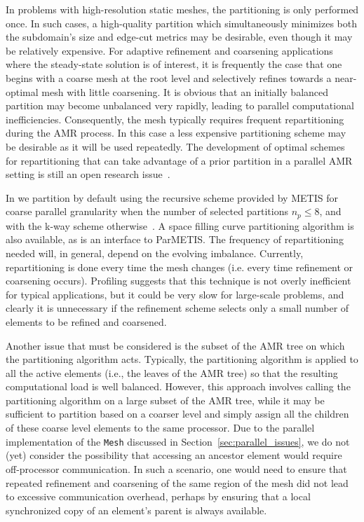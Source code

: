 In problems with high-resolution static meshes, the partitioning is
only performed once.  In such cases, a high-quality 
partition which simultaneously minimizes both the subdomain's
size and edge-cut metrics may be desirable, even though it may be
relatively expensive.  For adaptive refinement and coarsening 
applications where the steady-state solution is of interest, it is
frequently the case that one begins with a coarse mesh at the root
level and selectively refines towards a near-optimal mesh with
little coarsening. It is obvious that an initially balanced partition
may become unbalanced very rapidly, leading to parallel computational
inefficiencies. Consequently, the mesh typically requires frequent
repartitioning during the AMR process. In this case a less expensive partitioning scheme may be desirable as it will be used repeatedly.
The development of optimal
schemes for
repartitioning that can take advantage of a prior partition in a
parallel AMR setting is still an open research
issue~\cite{iqbal_carey_2005}.

In \libMesh{} we partition by default using the recursive scheme
provided by METIS for coarse parallel granularity when the number of selected partitions $n_p \leq8$,
and with the k-way scheme otherwise~\cite{karypis:metis}.  A space filling
curve partitioning algorithm is also available, as is an interface to
ParMETIS.  The frequency of repartitioning needed will, in general,
depend on the evolving imbalance.  Currently, repartitioning is done
every time the mesh changes (i.e. every time refinement or coarsening
occurs).  Profiling suggests that this technique is not overly
inefficient for typical applications, but it could be very slow for
large-scale problems, and clearly it is unnecessary if the refinement
scheme selects only a small number of elements to be refined and
coarsened.  %

\enlargethispage{-\baselineskip}
Another issue that must be considered is the subset of the AMR tree on
which the partitioning algorithm acts. Typically, the partitioning
algorithm is applied to all the active elements (i.e., the leaves of
the AMR tree) so that the resulting computational load is well balanced.  However, this approach involves calling
the partitioning algorithm on a large subset of the AMR tree, while it may
be sufficient to partition based on a coarser level and simply assign
all the children of these coarse level elements to the same processor.
Due to the parallel implementation of the \texttt{Mesh} discussed in
Section~\ref{sec:parallel_issues}, we do not (yet) consider the
possibility that accessing an ancestor element would require
off-processor communication.  In such a scenario, one would need to
ensure that repeated refinement and coarsening of the same region of the mesh 
did not lead to excessive communication overhead, perhaps by ensuring
that a local synchronized copy of an element's parent is always available.



